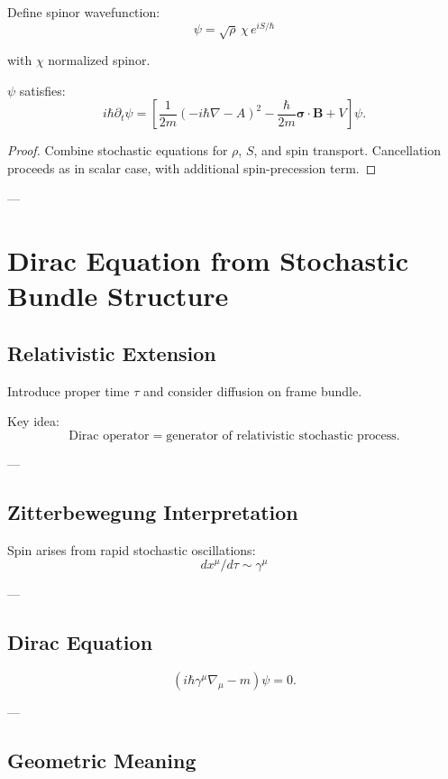 Define spinor wavefunction:
\[
\psi = \sqrt{\rho}\,\chi\, e^{iS/\hbar}
\]

with $\chi$ normalized spinor.

\begin{theorem}
$\psi$ satisfies:
\[
i\hbar \partial_t \psi =
\left[
\frac{1}{2m}(-i\hbar\nabla - A)^2
- \frac{\hbar}{2m}\bm{\sigma}\cdot \bm{B}
+ V
\right]\psi.
\]
\end{theorem}

\begin{proof}
Combine stochastic equations for $\rho$, $S$, and spin transport. Cancellation proceeds as in scalar case, with additional spin-precession term.
\end{proof}

---

\section{Dirac Equation from Stochastic Bundle Structure}

\subsection{Relativistic Extension}

Introduce proper time $\tau$ and consider diffusion on frame bundle.

Key idea:
\[
\text{Dirac operator} = \text{generator of relativistic stochastic process}.
\]

---

\subsection{Zitterbewegung Interpretation}

Spin arises from rapid stochastic oscillations:
\[
dx^\mu/d\tau \sim \gamma^\mu
\]

---

\subsection{Dirac Equation}

\[
(i\hbar \gamma^\mu \nabla_\mu - m)\psi = 0.
\]

---

\subsection{Geometric Meaning}

